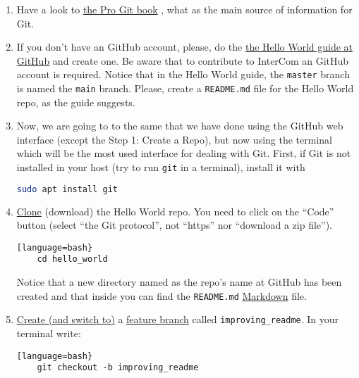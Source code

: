 \begin{enumerate}
  
\item Have a look to \href{https://git-scm.com/book/en/v2}{the Pro Git
  book} \cite{Git-book}, what as the main source of information for
  Git.

\item If you don't have an GitHub account, please, do the
  \href{https://guides.github.com/activities/hello-world/}{the Hello
    World guide at GitHub} and create one. Be aware that to contribute
  to InterCom an GitHub account is required. Notice that in the Hello
  World guide, the \texttt{master} branch is named the \texttt{main}
  branch. Please, create a \texttt{README.md} file for the Hello World
  repo, as the guide suggests.

\item Now, we are going to to the same that we have done using the
  GitHub web interface (except the Step 1: Create a Repo), but now
  using the terminal which will be the most used interface for dealing
  with Git. First, if Git is not installed in your host (try to run
  \texttt{git} in a terminal), install it with
  \begin{lstlisting}[language=bash]
    sudo apt install git
  \end{lstlisting}

\item
  \href{https://docs.github.com/en/github/getting-started-with-github/github-glossary#clone}{Clone}
  (download) the Hello World repo. You need to click on the ``Code''
  button (select ``the Git protocol'', not ``https'' nor ``download a
  zip file'').

  \begin{lstlisting}[language=bash}
    cd hello_world
  \end{lstlisting}

  Notice that a new directory named as the repo's name at
  GitHub has been created and that inside you can find the
  \texttt{README.md}
  \href{https://daringfireball.net/projects/markdown/}{Markdown} file.

\item \href{https://docs.github.com/en/github/getting-started-with-github/github-glossary#checkout}{Create (and switch to)} a
  \href{https://docs.github.com/en/github/getting-started-with-github/github-glossary#feature-branch}{feature
    branch} called \texttt{improving_readme}. In your terminal write:
  
  \begin{lstlisting}[language=bash}
    git checkout -b improving_readme
  \end{lstlisting}
  

\end{enumerate}
